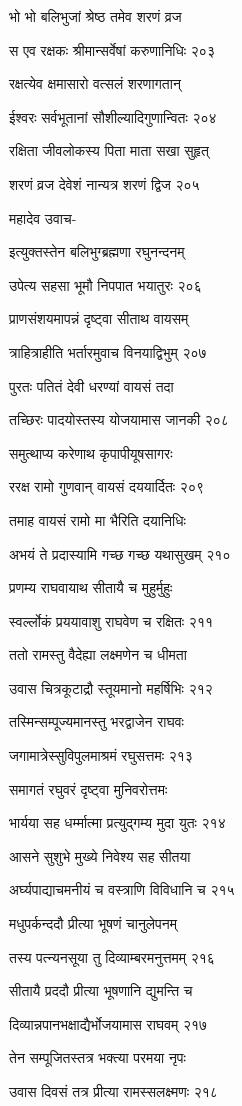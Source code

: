 भो भो बलिभुजां श्रेष्ठ तमेव शरणं व्रज

स एव रक्षकः श्रीमान्सर्वेषां करुणानिधिः २०३

रक्षत्येव क्षमासारो वत्सलं शरणागतान्

ईश्वरः सर्वभूतानां सौशील्यादिगुणान्वितः २०४

रक्षिता जीवलोकस्य पिता माता सखा सुहृत्

शरणं व्रज देवेशं नान्यत्र शरणं द्विज २०५

महादेव उवाच-

इत्युक्तस्तेन बलिभुग्ब्रह्मणा रघुनन्दनम्

उपेत्य सहसा भूमौ निपपात भयातुरः २०६

प्राणसंशयमापन्नं दृष्ट्वा सीताथ वायसम्

त्राहित्राहीति भर्तारमुवाच विनयाद्विभुम् २०७

पुरतः पतितं देवी धरण्यां वायसं तदा

तच्छिरः पादयोस्तस्य योजयामास जानकी २०८

समुत्थाप्य करेणाथ कृपापीयूषसागरः

ररक्ष रामो गुणवान् वायसं दययार्दितः २०९

तमाह वायसं रामो मा भैरिति दयानिधिः

अभयं ते प्रदास्यामि गच्छ गच्छ यथासुखम् २१०

प्रणम्य राघवायाथ सीतायै च मुहुर्मुहुः

स्वर्ल्लोकं प्रययावाशु राघवेण च रक्षितः २११

ततो रामस्तु वैदेह्या लक्ष्मणेन च धीमता

उवास चित्रकूटाद्रौ स्तूयमानो महर्षिभिः २१२

तस्मिन्सम्पूज्यमानस्तु भरद्वाजेन राघवः

जगामात्रेस्सुविपुलमाश्रमं रघुसत्तमः २१३

समागतं रघुवरं दृष्ट्वा मुनिवरोत्तमः

भार्यया सह धर्म्मात्मा प्रत्युद्गम्य मुदा युतः २१४

आसने सुशुभे मुख्ये निवेश्य सह सीतया

अर्घ्यपाद्याचमनीयं च वस्त्राणि विविधानि च २१५

मधुपर्कन्ददौ प्रीत्या भूषणं चानुलेपनम्

तस्य पत्न्यनसूया तु दिव्याम्बरमनुत्तमम् २१६

सीतायै प्रददौ प्रीत्या भूषणानि द्युमन्ति च

दिव्यान्नपानभक्षाद्यैर्भोजयामास राघवम् २१७

तेन सम्पूजितस्तत्र भक्त्या परमया नृपः

उवास दिवसं तत्र प्रीत्या रामस्सलक्ष्मणः २१८

